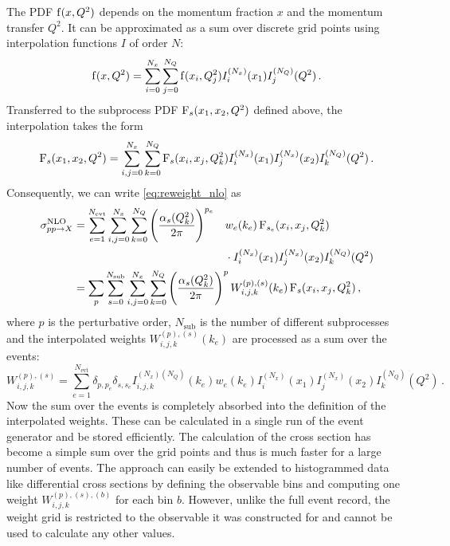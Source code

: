 The PDF $\operatorname{f}(x,Q^2)$ depends on the momentum fraction $x$ and the momentum transfer $Q^2$.
It can be approximated as a sum over discrete grid points using interpolation functions $I$ of order $N$:
%
\begin{equation}
	\operatorname{f}(x,Q^2) = \sum_{i=0}^{N_x} \sum_{j=0}^{N_Q} \operatorname{f}(x_i,Q_j^2) I_i^{(N_x)}(x_1) I_j^{(N_Q)}(Q^2) \, .
\end{equation}
%
Transferred to the subprocess PDF $\operatorname{F}_s(x_1,x_2,Q^2)$ defined above, the interpolation takes the form
%
\begin{equation}
	\operatorname{F}_s(x_1,x_2,Q^2) = \sum_{i,j=0}^{N_x} \sum_{k=0}^{N_Q} \operatorname{F}_s(x_i,x_j,Q_k^2) I_i^{(N_x)}(x_1) I_j^{(N_x)}(x_2) I_k^{(N_Q)}(Q^2) \, .
\end{equation}
%
Consequently, we can write \eqref{eq:reweight_nlo} as
%
\begin{alignat}{3}
  \sigma^\text{NLO}_{pp \rightarrow X}	&= \sum_{e=1}^{N_\text{evt}} \sum_{i,j=0}^{N_x} \sum_{k=0}^{N_Q} \left( \frac{\alpha_s(Q_k^2)}{2 \pi} \right)^{p_e} &&w_e(k_e) \subpdf_{s_e}(x_i,x_j,Q_k^2) \nonumber \\
  										&	&&\cdot I_i^{(N_x)}(x_1) I_j^{(N_x)}(x_2) I_k^{(N_Q)}(Q^2) \nonumber \\
  										&= \mathrlap{\sum_p \sum_{s=0}^{N_\text{sub}} \sum_{i,j=0}^{N_x} \sum_{k=0}^{N_Q} \left( \frac{\alpha_s(Q_k^2)}{2 \pi} \right)^{p} W_{i,j,k}^{(p),(s)}(k_e) \subpdf_{s}(x_i,x_j,Q_k^2) \, ,}
\end{alignat}
%
where $p$ is the perturbative order, $N_\text{sub}$ is the number of different subprocesses and the interpolated weights $W_{i,j,k}^{(p),(s)}(k_e)$ are processed as a sum over the events:
\begin{equation}
	W_{i,j,k}^{(p),(s)} = \sum_{e=1}^{N_\text{evt}} \delta_{p,p_e} \delta_{s,s_e} I_{i,j,k}^{(N_x) (N_Q)}(k_e) w_e(k_e) I_i^{(N_x)}(x_1) I_j^{(N_x)}(x_2) I_k^{(N_Q)}(Q^2) \, .
\end{equation}
%
Now the sum over the events is completely absorbed into the definition of the interpolated weights.
These can be calculated in a single run of the event generator and be stored efficiently.
The calculation of the cross section has become a simple sum over the grid points and thus is much faster for a large number of events.
The approach can easily be extended to histogrammed data like differential cross sections by defining the observable bins and computing one weight $W_{i,j,k}^{(p),(s),(b)}$ for each bin $b$.
However, unlike the full event record, the weight grid is restricted to the observable it was constructed for and cannot be used to calculate any other values.

